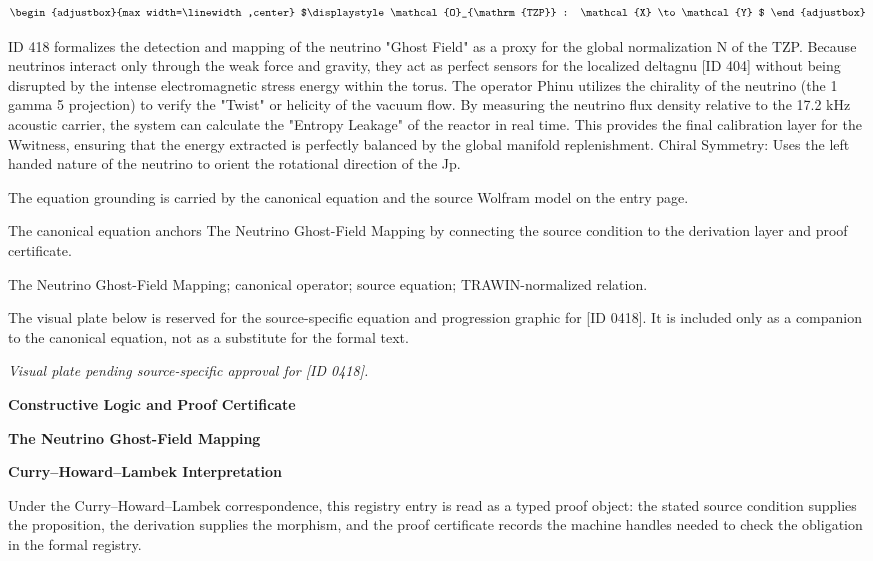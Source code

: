\[
\begin{adjustbox}{max width=\linewidth,center}
$\displaystyle
\mathcal{O}_{\mathrm{TZP}} : \mathcal{X} \to \mathcal{Y}
$
\end{adjustbox}
\]

ID 418 formalizes the detection and mapping of the neutrino "Ghost Field" as a proxy for the global normalization N of the TZP. Because neutrinos interact only through the weak force and gravity, they act as perfect sensors for the localized deltagnu [ID 404] without being disrupted by the intense electromagnetic stress energy within the torus. The operator Phinu utilizes the chirality of the neutrino (the 1 gamma 5 projection) to verify the "Twist" or helicity of the vacuum flow. By measuring the neutrino flux density relative to the 17.2 kHz acoustic carrier, the system can calculate the "Entropy Leakage" of the reactor in real time. This provides the final calibration layer for the Wwitness, ensuring that the energy extracted is perfectly balanced by the global manifold replenishment. Chiral Symmetry: Uses the left handed nature of the neutrino to orient the rotational direction of the Jp.

The equation grounding is carried by the canonical equation and the source Wolfram model on the entry page.

The canonical equation anchors The Neutrino Ghost-Field Mapping by connecting the source condition to the derivation layer and proof certificate.

The Neutrino Ghost-Field Mapping; canonical operator; source equation; TRAWIN-normalized relation.
\endgroup

\begingroup\footnotesize\sloppy
The visual plate below is reserved for the source-specific equation and progression graphic for [ID 0418]. It is included only as a companion to the canonical equation, not as a substitute for the formal text.
\par\endgroup
\begingroup\footnotesize\itshape
Visual plate pending source-specific approval for [ID 0418].
\par\endgroup

\clearpage
\begingroup\tzpsupportsetup
\noindent\textbf{\fontsize{10.8pt}{12.8pt}\selectfont [ID 0418] Constructive Logic and Proof Certificate}\par
\noindent\textbf{\fontsize{10pt}{12pt}\selectfont The Neutrino Ghost-Field Mapping}\par
\vspace{0.45em}
\begingroup
\footnotesize
\setlength{\parskip}{0.22em}
\setlength{\parindent}{0pt}
\noindent\textbf{Curry--Howard--Lambek Interpretation}\par
Under the Curry--Howard--Lambek correspondence, this registry entry is read as a typed proof
object: the stated source condition supplies the proposition, the derivation supplies the
morphism, and the proof certificate records the machine handles needed to check the obligation
in the formal registry.

